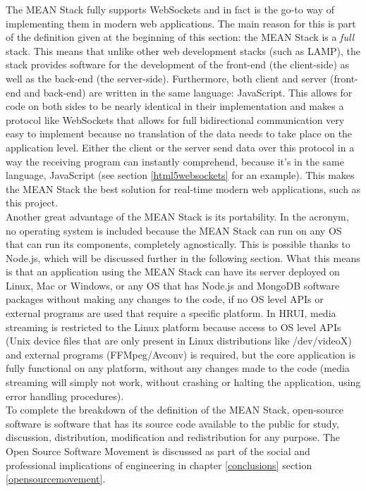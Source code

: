 The MEAN Stack fully supports WebSockets and in fact is the go-to way of implementing them in modern web applications. The
main reason for this is part of the definition given at the beginning of this section: the MEAN Stack is a \textit{full}
stack. This means that unlike other web development stacks (such as LAMP), the stack provides software for the development of
the front-end (the client-side) as well as the back-end (the server-side). Furthermore, both client and server (front-end and
back-end) are written in the same language: JavaScript. This allows for code on both sides to be nearly identical in their
implementation and makes a protocol like WebSockets that allows for full bidirectional communication very easy to implement
because no translation of the data needs to take place on the application level. Either the client or the server send data
over this protocol in a way the receiving program can instantly comprehend, because it's in the same language, JavaScript  
(see section \ref{html5websockets} for an example). This makes the MEAN Stack the best solution for real-time modern web
applications, such as this project.\\

Another great advantage of the MEAN Stack is its portability. In the acronym, no operating system is included because the MEAN
Stack can run on any OS that can run its components, completely agnostically. This is possible thanks to Node.js, which will
be discussed further in the following section. What this means is that an application using the MEAN Stack can have its
server deployed on Linux, Mac or Windows, or any OS that has Node.js and MongoDB software packages without making any changes
to the code, if no OS level APIs or external programs are used that require a specific platform. In HRUI, media streaming is
restricted to the Linux platform because access to OS level APIs (Unix device files that are only present in Linux
distributions like /dev/videoX) and external programs (FFMpeg/Avconv) is required, but the core application is fully
functional on any platform, without any changes made to the code (media streaming will simply not work, without crashing or
halting the application, using error handling procedures).\\

To complete the breakdown of the definition of the MEAN Stack, open-source software is software that has its source code
available to the public for study, discussion, distribution, modification and redistribution for any purpose. The Open Source
Software Movement is discussed as part of the social and professional implications of engineering in chapter \ref{conclusions}
section \ref{opensourcemovement}.\\

